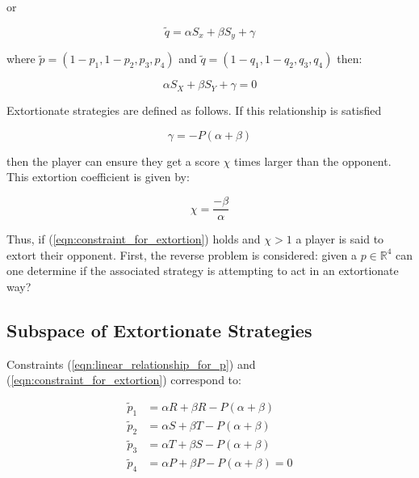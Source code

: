 \documentclass[a4paper]{article}
\begin{document}
or

\begin{equation}\label{eqn:linear_relationship_for_q}
    \tilde q=\alpha S_x + \beta S_y + \gamma
\end{equation}

 where \(\tilde p = (1 - p_1, 1 - p_2, p_3, p_4)\) and
\(\tilde q = (1 - q_1, 1 - q_2, q_3, q_4)\) then:

\begin{equation}
    \alpha S_X + \beta S_Y + \gamma = 0
\end{equation}

Extortionate strategies are defined as follows. If this relationship is
satisfied

\begin{equation}\label{eqn:constraint_for_extortion}
    \gamma = - P(\alpha + \beta)
\end{equation}

then the player can ensure they get a score \(\chi\) times
larger than the opponent. This extortion coefficient is given by:

\begin{equation}\label{eqn:definition_of_chi}
    \chi=\frac{-\beta}{\alpha}
\end{equation}

\noindent Thus, if (\ref{eqn:constraint_for_extortion}) holds and \(\chi >1\) a player is
said to extort their opponent.
First, the reverse problem is considered: given a
\(p\in\mathbb{R}^4\) can one determine if the associated strategy is attempting
to act in an extortionate way?

\subsection{Subspace of Extortionate Strategies}

Constraints (\ref{eqn:linear_relationship_for_p}) and
(\ref{eqn:constraint_for_extortion}) correspond to:

\begin{align}
    \tilde p_1 & = \alpha R + \beta R - P (\alpha + \beta)
            \label{eqn:condition_for_tilde_p1}\\
    \tilde p_2 & = \alpha S + \beta T - P (\alpha + \beta)
            \label{eqn:condition_for_tilde_p2}\\
    \tilde p_3 & = \alpha T + \beta S - P (\alpha + \beta)
            \label{eqn:condition_for_tilde_p3}\\
    \tilde p_4 & = \alpha P + \beta P - P (\alpha + \beta) = 0
            \label{eqn:condition_for_tilde_p4}
\end{align}
\end{document}
